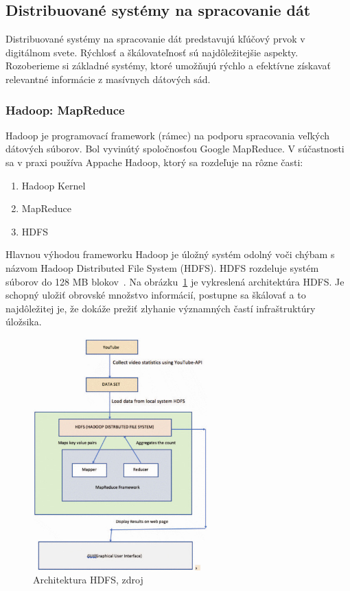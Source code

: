 \documentclass[10pt,twoside,slovak,a4paper]{article}
\begin{document}
\subsection{Distribuované systémy na spracovanie dát} \label{Distribuovane}

Distribuované systémy na spracovanie dát predstavujú kľúčový prvok v digitálnom svete. Rýchlosť a škálovateľnosť sú najdôležitejšie aspekty. Rozoberieme si základné systémy, ktoré umožňujú rýchlo a efektívne získavať relevantné informácie z masívnych dátových sád.

\subsubsection {Hadoop: MapReduce}

Hadoop je programovací framework (rámec) na podporu spracovania veľkých dátových súborov. Bol vyvinútý spoločnosťou Google MapReduce. V súčastnosti sa v praxi používa Appache Hadoop, ktorý sa rozdeľuje na rôzne časti:

\begin{enumerate}
\item Hadoop Kernel
\item MapReduce
\item HDFS
\end{enumerate}

Hlavnou výhodou frameworku Hadoop je úložný systém odolný voči chýbam s názvom Hadoop Distributed File System (HDFS). HDFS rozdeluje systém súborov do 128 MB blokov~\cite{HDFS}. Na obrázku~\ref{HadoopObrazok} je vykreslená architektúra HDFS. Je schopný uložiť obrovské množstvo informácií, postupne sa škálovať a to najdôležitej je, že dokáže prežiť zlyhanie významných častí infraštruktúry úložsika.
\begin{figure}[H]
  \centering
  \includegraphics[width=0.6\textwidth]{Hadoop.jpg}
  \caption{Architektura HDFS, zdroj \cite{HadoopObrazok}}
  \label{HadoopObrazok}
\end{figure}
\end{document}

